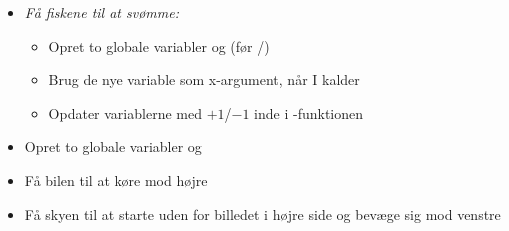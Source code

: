 \documentclass{ucph-handout}
\begin{document}
\begin{exercisebox}[adjusted title=Akvarie fortsat]
\begin{itemize}
  
\item \emph{Få fiskene til at svømme:}
  \begin{itemize}
  \item Opret to globale variabler  og
     (før /)
  \item Brug de nye variable som x-argument, når I kalder 
  \item Opdater variablerne med $+1$/$-1$ inde i -funktionen
  \end{itemize}
\end{itemize}
\end{exercisebox}
\begin{exercisebox}[adjusted title=Green City fortsat]
\begin{itemize}
\item Opret to globale variabler  og 
\item Få bilen til at køre mod højre
\item Få skyen til at starte uden for billedet i højre side og bevæge sig mod venstre
\end{itemize}
\end{exercisebox}
\end{document}
